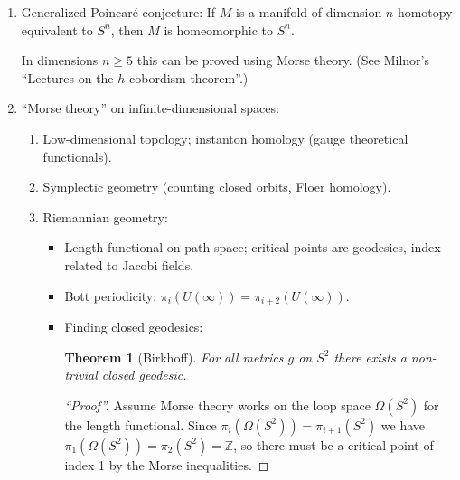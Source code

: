 \documentclass{article}
\newtheorem*{theorem}{Theorem}
\theoremstyle{definition}
\newcommand{\Z}{\mathbb{Z}}
\begin{document}
\begin{enumerate}[label=\textbf{\Roman* -}]
    \item Generalized Poincar\'e conjecture: If $M$ is a manifold of dimension
        $n$ homotopy equivalent to $S^n$, then $M$ is homeomorphic to $S^n$.

        In dimensions $n\ge5$ this can be proved using Morse theory. (See
        Milnor's ``Lectures on the $h$-cobordism theorem''.)

    \item ``Morse theory'' on infinite-dimensional spaces:
        \begin{enumerate}[label=(\alph*)]
            \item Low-dimensional topology; instanton homology
                (gauge theoretical functionals).

            \item Symplectic geometry (counting closed orbits, Floer homology).

            \item Riemannian geometry:
                \begin{itemize}
                    \item Length functional on path space; critical points are
                        geodesics, index related to Jacobi fields.

                    \item Bott periodicity:
                        $\pi_i(U(\infty))=\pi_{i+2}(U(\infty))$.

                    \item Finding closed geodesics:
                        \begin{theorem}[Birkhoff]
                            For all metrics $g$ on $S^2$ there exists a
                            non-trivial closed geodesic.
                        \end{theorem}

                        \begin{proof}[``Proof'']
                            Assume Morse theory works on the loop space
                            $\Omega(S^2)$ for the length functional. Since
                            $\pi_i(\Omega(S^2))=\pi_{i+1}(S^2)$ we have
                            $\pi_1(\Omega(S^2))=\pi_2(S^2)=\Z$, so there must be
                            a critical point of index 1 by the Morse
                            inequalities.
                        \end{proof}


\end{itemize}
\end{enumerate}
\end{enumerate}
\end{document}
